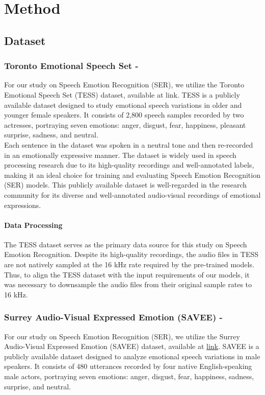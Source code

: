 \documentclass[a4paper,12pt]{article}
\begin{document}
\newpage
\section{Method}
\subsection{Dataset}

\subsubsection{Toronto Emotional Speech Set -}
For our study on Speech Emotion Recognition (SER), we utilize the Toronto Emotional Speech Set (TESS) dataset, available at link. TESS is a publicly available dataset designed to study emotional speech variations in older and younger female speakers. It consists of 2,800 speech samples recorded by two actresses, portraying seven emotions: anger, disgust, fear, happiness, pleasant surprise, sadness, and neutral.\\
Each sentence in the dataset was spoken in a neutral tone and then re-recorded in an emotionally expressive manner. The dataset is widely used in speech processing research due to its high-quality recordings and well-annotated labels, making it an ideal choice for training and evaluating Speech Emotion Recognition (SER) models. This publicly available dataset is well-regarded in the research community for its diverse and well-annotated audio-visual recordings of emotional expressions.

\paragraph{Data Processing}
The TESS dataset serves as the primary data source for this study on Speech Emotion Recognition. Despite its high-quality recordings, the audio files in TESS are not natively sampled at the 16 kHz rate required by the pre-trained models. Thus, to align the TESS dataset with the input requirements of our models, it was necessary to downsample the audio files from their original sample rates to 16 kHz.

\subsubsection{Surrey Audio-Visual Expressed Emotion (SAVEE) -}

For our study on Speech Emotion Recognition (SER), we utilize the Surrey Audio-Visual Expressed Emotion (SAVEE) dataset, available at \href{https://www.kaggle.com/datasets/ejlok1/surrey-audiovisual-expressed-emotion-savee}{link}. SAVEE is a publicly available dataset designed to analyze emotional speech variations in male speakers. It consists of 480 utterances recorded by four native English-speaking male actors, portraying seven emotions: anger, disgust, fear, happiness, sadness, surprise, and neutral.
\end{document}
